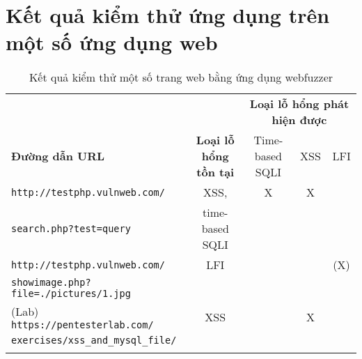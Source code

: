 \section{Kết quả kiểm thử ứng dụng trên một số ứng dụng web}
\begin{table}[ht]
    \centering
    \caption{Kết quả kiểm thử một số trang web bằng ứng dụng webfuzzer}
    \label{tab:testing-results}
    \begin{tabular}[ht]{lcccc}
        \toprule[1pt]\midrule[0.3pt]
            &{}&\multicolumn{3}{c}{\textbf{Loại lỗ hổng phát hiện được}}\\ \cmidrule{3-5}\textbf{Đường dẫn URL} &\textbf{Loại lỗ hổng tồn tại}&Time-based SQLI&XSS&LFI\\ 
        \midrule
            \texttt{http://testphp.vulnweb.com/}&XSS,&X&X& \\
            \texttt{search.php?test=query}&time-based SQLI& & & \\
            \addlinespace
            \texttt{http://testphp.vulnweb.com/}&LFI& & &(X)\\
            \texttt{showimage.php?file=./pictures/1.jpg}& & & & \\
            \addlinespace
            (Lab) \texttt{https://pentesterlab.com/}&XSS&&X& \\
            \texttt{exercises/xss\_and\_mysql\_file/}& & & & \\
            \addlinespace
        \midrule[0.3pt]\bottomrule[1pt]
    \end{tabular}
\end{table}
